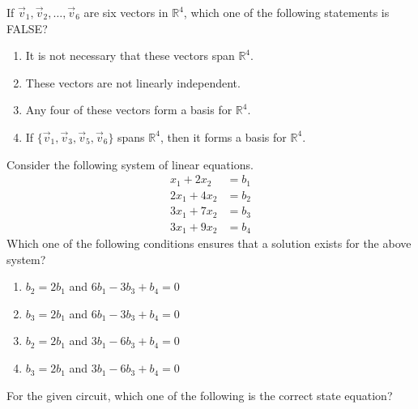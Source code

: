    \item If $\vec{v}_1, \vec{v}_2, \dots, \vec{v}_6$ are six vectors in $\mathbb{R}^4$, which one of the following statements is FALSE?
    \hfill{}
    \begin{enumerate}
        \item It is not necessary that these vectors span $\mathbb{R}^4$.
        \item These vectors are not linearly independent.
        \item Any four of these vectors form a basis for $\mathbb{R}^4$.
        \item If $\{\vec{v}_1, \vec{v}_3, \vec{v}_5, \vec{v}_6\}$ spans $\mathbb{R}^4$, then it forms a basis for $\mathbb{R}^4$.
    \end{enumerate}
    \item Consider the following system of linear equations.
    \begin{align*}
        x_1 + 2x_2 &= b_1 \\
        2x_1 + 4x_2 &= b_2 \\
        3x_1 + 7x_2 &= b_3 \\
        3x_1 + 9x_2 &= b_4
    \end{align*}
    Which one of the following conditions ensures that a solution exists for the above system?
    \hfill{}
    \begin{multicols}{2}
    \begin{enumerate}
        \item $b_2=2b_1$ and $6b_1 - 3b_3 + b_4 = 0$
        \item $b_3=2b_1$ and $6b_1 - 3b_3 + b_4 = 0$
        \item $b_2=2b_1$ and $3b_1 - 6b_3 + b_4 = 0$
        \item $b_3=2b_1$ and $3b_1 - 6b_3 + b_4 = 0$
    \end{enumerate}
\end{multicols}
    \item For the given circuit, which one of the following is the correct state equation?

